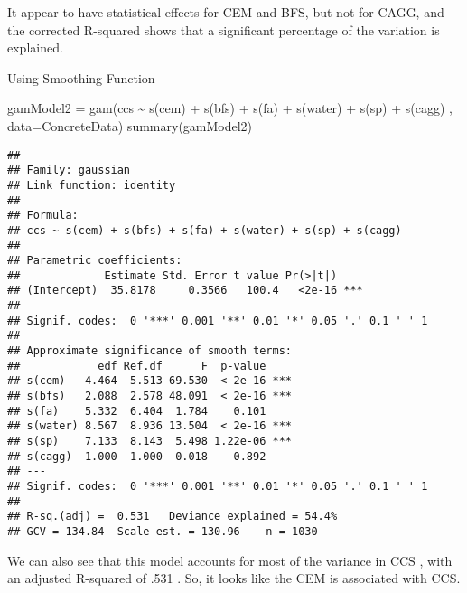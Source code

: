 \documentclass[
]{article}
\newenvironment{Shaded}{\begin{snugshade}}{\end{snugshade}}
\newcommand{\AttributeTok}[1]{\textcolor[rgb]{0.77,0.63,0.00}{#1}}
\newcommand{\DecValTok}[1]{\textcolor[rgb]{0.00,0.00,0.81}{#1}}
\newcommand{\FunctionTok}[1]{\textcolor[rgb]{0.00,0.00,0.00}{#1}}
\newcommand{\NormalTok}[1]{#1}
\newcommand{\OtherTok}[1]{\textcolor[rgb]{0.56,0.35,0.01}{#1}}
\newcommand{\SpecialCharTok}[1]{\textcolor[rgb]{0.00,0.00,0.00}{#1}}
\begin{document}
It appear to have statistical effects for CEM and BFS, but not for CAGG,
and the corrected R-squared shows that a significant percentage of the
variation is explained.

Using Smoothing Function

\begin{Shaded}
\begin{Highlighting}[]
\NormalTok{gamModel2 }\OtherTok{=} \FunctionTok{gam}\NormalTok{(ccs }\SpecialCharTok{\textasciitilde{}} \FunctionTok{s}\NormalTok{(cem) }\SpecialCharTok{+} \FunctionTok{s}\NormalTok{(bfs) }\SpecialCharTok{+} \FunctionTok{s}\NormalTok{(fa) }\SpecialCharTok{+} \FunctionTok{s}\NormalTok{(water) }\SpecialCharTok{+} \FunctionTok{s}\NormalTok{(sp) }\SpecialCharTok{+} \FunctionTok{s}\NormalTok{(cagg) , }\AttributeTok{data=}\NormalTok{ConcreteData)}
\FunctionTok{summary}\NormalTok{(gamModel2)}
\end{Highlighting}
\end{Shaded}

\begin{verbatim}
## 
## Family: gaussian 
## Link function: identity 
## 
## Formula:
## ccs ~ s(cem) + s(bfs) + s(fa) + s(water) + s(sp) + s(cagg)
## 
## Parametric coefficients:
##             Estimate Std. Error t value Pr(>|t|)    
## (Intercept)  35.8178     0.3566   100.4   <2e-16 ***
## ---
## Signif. codes:  0 '***' 0.001 '**' 0.01 '*' 0.05 '.' 0.1 ' ' 1
## 
## Approximate significance of smooth terms:
##            edf Ref.df      F  p-value    
## s(cem)   4.464  5.513 69.530  < 2e-16 ***
## s(bfs)   2.088  2.578 48.091  < 2e-16 ***
## s(fa)    5.332  6.404  1.784    0.101    
## s(water) 8.567  8.936 13.504  < 2e-16 ***
## s(sp)    7.133  8.143  5.498 1.22e-06 ***
## s(cagg)  1.000  1.000  0.018    0.892    
## ---
## Signif. codes:  0 '***' 0.001 '**' 0.01 '*' 0.05 '.' 0.1 ' ' 1
## 
## R-sq.(adj) =  0.531   Deviance explained = 54.4%
## GCV = 134.84  Scale est. = 130.96    n = 1030
\end{verbatim}

We can also see that this model accounts for most of the variance in CCS
, with an adjusted R-squared of .531 . So, it looks like the CEM is
associated with CCS.

\begin{Shaded}
\end{Shaded}
\end{document}
